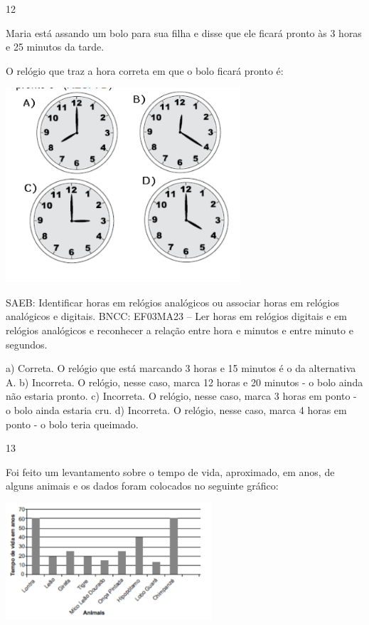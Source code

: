 {\begin{escolha}
{\num{12}

Maria está assando um bolo para sua filha e disse que ele ficará pronto às 3 horas e 25 minutos da tarde.

O relógio que traz a hora correta em que o bolo ficará pronto é:


\includegraphics[width=3.44197in,height=2.84191in]{media/image126.png}

SAEB: Identificar horas em relógios analógicos ou associar horas em relógios analógicos e digitais.
BNCC: EF03MA23 – Ler horas em relógios digitais e em relógios analógicos e reconhecer a relação
entre hora e minutos e entre minuto e segundos.

a) Correta. O relógio que está marcando 3 horas e 15 minutos é o da alternativa A.
b) Incorreta. O relógio, nesse caso, marca 12 horas e 20 minutos - o bolo ainda não estaria pronto.
c) Incorreta. O relógio, nesse caso, marca 3 horas em ponto - o bolo ainda estaria cru.
d) Incorreta. O relógio, nesse caso, marca 4 horas em ponto - o bolo teria queimado.

\num{13}

Foi feito um levantamento sobre o tempo de vida, aproximado, em anos, de alguns animais e os dados foram colocados no seguinte gráfico:

\includegraphics[width=3.02451in,height=1.70004in]{media/image127.png}

}
\end{escolha}}
